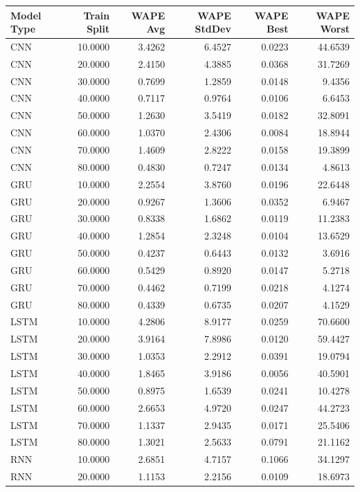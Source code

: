 \begin{tabular}{lrrrrr}
\toprule
Model Type & Train Split & WAPE Avg & WAPE StdDev & WAPE Best & WAPE Worst \\
\midrule
CNN & 10.0000 & 3.4262 & 6.4527 & 0.0223 & 44.6539 \\
CNN & 20.0000 & 2.4150 & 4.3885 & 0.0368 & 31.7269 \\
CNN & 30.0000 & 0.7699 & 1.2859 & 0.0148 & 9.4356 \\
CNN & 40.0000 & 0.7117 & 0.9764 & 0.0106 & 6.6453 \\
CNN & 50.0000 & 1.2630 & 3.5419 & 0.0182 & 32.8091 \\
CNN & 60.0000 & 1.0370 & 2.4306 & 0.0084 & 18.8944 \\
CNN & 70.0000 & 1.4609 & 2.8222 & 0.0158 & 19.3899 \\
CNN & 80.0000 & 0.4830 & 0.7247 & 0.0134 & 4.8613 \\
GRU & 10.0000 & 2.2554 & 3.8760 & 0.0196 & 22.6448 \\
GRU & 20.0000 & 0.9267 & 1.3606 & 0.0352 & 6.9467 \\
GRU & 30.0000 & 0.8338 & 1.6862 & 0.0119 & 11.2383 \\
GRU & 40.0000 & 1.2854 & 2.3248 & 0.0104 & 13.6529 \\
GRU & 50.0000 & 0.4237 & 0.6443 & 0.0132 & 3.6916 \\
GRU & 60.0000 & 0.5429 & 0.8920 & 0.0147 & 5.2718 \\
GRU & 70.0000 & 0.4462 & 0.7199 & 0.0218 & 4.1274 \\
GRU & 80.0000 & 0.4339 & 0.6735 & 0.0207 & 4.1529 \\
LSTM & 10.0000 & 4.2806 & 8.9177 & 0.0259 & 70.6600 \\
LSTM & 20.0000 & 3.9164 & 7.8986 & 0.0120 & 59.4427 \\
LSTM & 30.0000 & 1.0353 & 2.2912 & 0.0391 & 19.0794 \\
LSTM & 40.0000 & 1.8465 & 3.9186 & 0.0056 & 40.5901 \\
LSTM & 50.0000 & 0.8975 & 1.6539 & 0.0241 & 10.4278 \\
LSTM & 60.0000 & 2.6653 & 4.9720 & 0.0247 & 44.2723 \\
LSTM & 70.0000 & 1.1337 & 2.9435 & 0.0171 & 25.5406 \\
LSTM & 80.0000 & 1.3021 & 2.5633 & 0.0791 & 21.1162 \\
RNN & 10.0000 & 2.6851 & 4.7157 & 0.1066 & 34.1297 \\
RNN & 20.0000 & 1.1153 & 2.2156 & 0.0109 & 18.6973 \\

\end{tabular}
